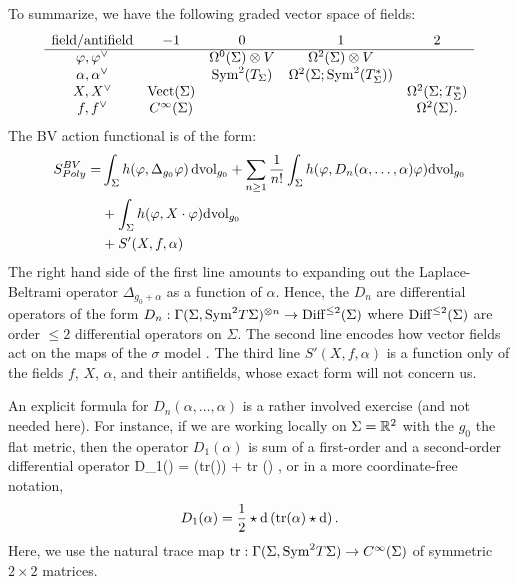 To summarize, we have the following graded vector space of fields:
\[
\begin{array}{ccccc}
\text{field/antifield} & -1 &0 & 1 & 2\\
\hline
\varphi, \varphi^\vee & & \Omega^{0}(\Sigma) \otimes V & \Omega^2(\Sigma) \otimes V & \\
\alpha, \alpha^\vee & & {\rm Sym}^2(T_\Sigma) & \Omega^2(\Sigma ; {\rm Sym}^{2}(T^*_\Sigma)) & \\
X, X^\vee & {\rm Vect}(\Sigma) & & & \Omega^2(\Sigma ; T^*_\Sigma)\\
f, f^\vee & C^\infty(\Sigma) &&& \Omega^2(\Sigma) .
\end{array}
\]
The BV action functional is of the form:
\begin{equation}\label{polyakov bv}
\begin{align*}
S^{BV}_{Poly} = 
& \int_\Sigma h(\varphi, \Delta_{g_0} \varphi)\, {\rm dvol}_{g_0} + \sum_{n \geq 1} \frac{1}{n!} \int_{\Sigma} h(\varphi, D_n(\alpha,\ldots,\alpha) \varphi) {\rm dvol}_{g_0} \\
& +  \int_{\Sigma} h(\varphi, X \cdot \varphi) {\rm dvol}_{g_0} \\
& +  S'(X, f, \alpha) 
\end{align*}
\end{equation}
The right hand side of the first line amounts to expanding out the Laplace-Beltrami operator $\Delta_{g_0 + \alpha}$ as a function of $\alpha$.
Hence, the $D_n$ are differential operators of the form 
$D_n : \Gamma(\Sigma , {\rm Sym}^2 T\Sigma)^{\otimes n} \to {\rm Diff}^{\leq 2} (\Sigma)$ 
where ${\rm Diff}^{\leq 2}(\Sigma)$ are order $\leq 2$ differential operators on $\Sigma$.
The second line encodes how vector fields act on the maps of the $\sigma$ model . 
The third line $S'(X, f, \alpha)$ is a function only of the fields $f$, $X$, $\alpha$, and their antifields,
whose exact form will not concern us. 

An explicit formula for $D_n(\alpha,\ldots,\alpha)$ is a rather involved exercise (and not needed here).
For instance, if we are working locally on $\Sigma = \mathbb R^2$ with the $g_0$ the flat metric, 
then the operator $D_1(\alpha)$ is sum of a first-order and a second-order differential operator
\ben
D_1(\alpha) =   ({\rm tr}(\alpha))  +  {\rm tr} (\alpha)  , 
\een
or in a more coordinate-free notation, 
\[
D_1(\alpha) = \frac{1}{2} \star {\rm d} \left({\rm tr}(\alpha) \star {\rm d}\right).
\] 
Here, we use the natural trace map ${\rm tr} : \Gamma(\Sigma , {\rm Sym}^2 T\Sigma) \to C^\infty(\Sigma)$ of symmetric $2\times2$ matrices. 

